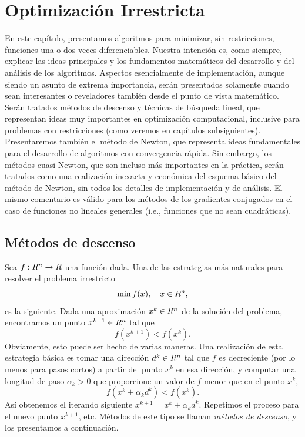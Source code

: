 
\chapter{Optimización Irrestricta}\label{v2:chap:3}

En este capítulo, presentamos algoritmos para minimizar, sin restricciones, funciones una o dos veces diferenciables. Nuestra intención es, como siempre, explicar las ideas principales y los fundamentos matemáticos del desarrollo y del análisis de los algoritmos. Aspectos esencialmente de implementación, aunque siendo un asunto de extrema importancia, serán presentados solamente cuando sean interesantes o reveladores también desde el punto de vista matemático. Serán tratados métodos de descenso y técnicas de búsqueda lineal, que representan ideas muy importantes en optimización computacional, inclusive para problemas con restricciones (como veremos en capítulos subsiguientes). Presentaremos también el método de Newton, que representa ideas fundamentales para el desarrollo de algoritmos con convergencia rápida. Sin embargo, los métodos cuasi-Newton, que son incluso más importantes en la práctica, serán tratados como una realización inexacta y económica del esquema básico del método de Newton, sin todos los detalles de implementación y de análisis. El mismo comentario es válido para los métodos de los gradientes conjugados en el caso de funciones no lineales generales (i.e., funciones que no sean cuadráticas).

\section{Métodos de descenso}\label{v2:sec:3.1}

Sea $f : R^n \to R$ una función dada. Una de las estrategias más naturales para resolver el problema irrestricto
\begin{equation}
    \min f(x), \quad x \in R^n,
    \label{v2:eq:3.1}
\end{equation}
es la siguiente. Dada una aproximación $x^k \in R^n$ de la solución del problema, encontramos un punto $x^{k+1} \in R^n$ tal que
\[
    f(x^{k+1}) < f(x^k).
\]
Obviamente, esto puede ser hecho de varias maneras. Una realización de esta estrategia básica es tomar una dirección $d^k \in R^n$ tal que $f$ es decreciente (por lo menos para pasos cortos) a partir del punto $x^k$ en esa dirección, y computar una longitud de paso $\alpha_k > 0$ que proporcione un valor de $f$ menor que en el punto $x^k$,
\[
    f(x^k + \alpha_k d^k) < f(x^k).
\]
Así obtenemos el iterando siguiente $x^{k+1} = x^k + \alpha_k d^k$. Repetimos el proceso para el nuevo punto $x^{k+1}$, etc. Métodos de este tipo se llaman \textit{métodos de descenso}, y los presentamos a continuación.


